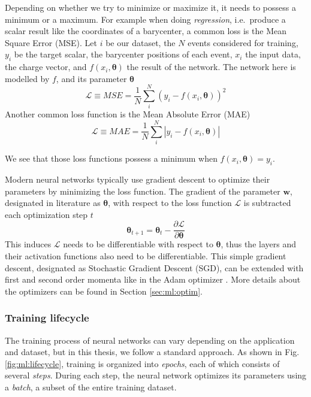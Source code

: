 \documentclass[../main.tex]{subfiles}
\begin{document}
Depending on whether we try to minimize or maximize it, it needs to possess a minimum or a maximum. For example when doing \textit{regression}, i.e.\ produce a scalar result like the coordinates of a barycenter, a common loss is the Mean Square Error (MSE). Let $i$ be our dataset, the $N$ events considered for training, $y_i$ be the target scalar, the barycenter positions of each event, $x_i$ the input data, the charge vector, and $f(x_i, \bm{\theta})$ the result of the network. The network here is modelled by $f$, and its parameter $\bm{\theta}$
\begin{equation}
  \mathcal{L} \equiv MSE = \frac{1}{N} \sum_i^N (y_i - f(x_i, \bm{\theta}))^2
\end{equation}
Another common loss function is the Mean Absolute Error (MAE)
\begin{equation}
  \mathcal{L} \equiv MAE = \frac{1}{N} \sum_i^N |y_i - f(x_i, \bm{\theta})|
\end{equation}

We see that those loss functions possess a minimum when $f(x_i, \bm{\theta}) = y_i$.


Modern neural networks typically use gradient descent to optimize their parameters by minimizing the loss function. The gradient of the parameter $\bm{w}$, designated in literature as $\bm{\theta}$, with respect to the loss function $\mathcal{L}$ is subtracted each optimization step $t$
\begin{equation}
  \bm{\theta}_{t+1} = \bm{\theta}_t - \frac{\partial \mathcal{L}}{\partial \bm{\theta}}
\end{equation}
This induces $\mathcal{L}$  needs to be differentiable with respect to $\bm{\theta}$, thus the layers and their activation functions also need to be differentiable. This simple gradient descent, designated as Stochastic Gradient Descent (SGD), can be extended with first and second order momenta like in the Adam optimizer \cite{kingma_adam_2017}. More details about the optimizers can be found in Section \ref{sec:ml:optim}.

\subsubsection{Training lifecycle}

The training process of neural networks can vary depending on the application and dataset, but in this thesis, we follow a standard approach. As shown in Fig. \ref{fig:ml:lifecycle}, training is organized into \textit{epochs}, each of which consists of several \textit{steps}. During each step, the neural network optimizes its parameters using a \textit{batch}, a subset of the entire training dataset.
\end{document}

